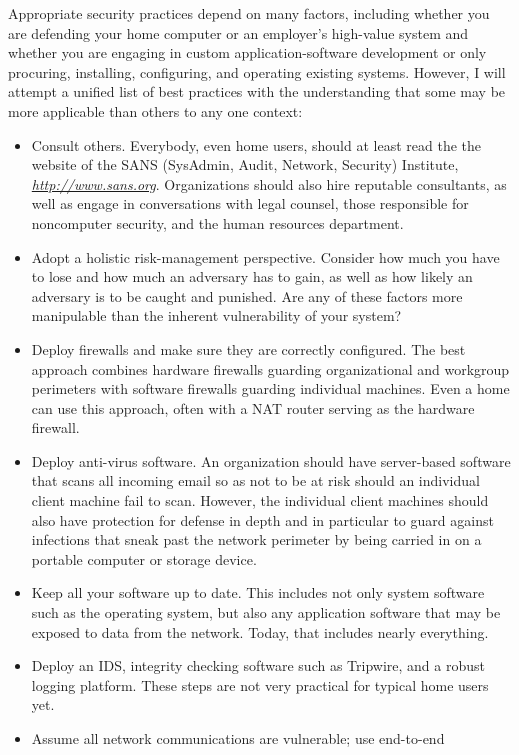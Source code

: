Appropriate security practices depend on many factors, including
whether you are defending your home computer or an employer's
high-value system and whether you are engaging in custom
application-software development or only procuring, installing,
configuring, and operating existing systems.  However, I will attempt
a unified list of best practices with the understanding that some may
be more applicable than others to any one context:
\begin{itemize}
\item
Consult others.  Everybody, even home users, should at least read the
the website of the SANS (SysAdmin, Audit, Network,
Security) Institute, \textit{\url{http://www.sans.org}}.  Organizations should also hire reputable
consultants, as well as engage in conversations with legal counsel,
those responsible for noncomputer security, and the human resources
department.
\item
Adopt a holistic risk-management perspective.  Consider how much you
have to lose and how much an adversary has to gain, as well as how
likely an adversary is to be caught and punished.  Are any of these
factors more manipulable than the inherent vulnerability of your
system?
\item
Deploy firewalls and make sure they are correctly configured.  The
best approach combines hardware firewalls guarding organizational and
workgroup perimeters with software firewalls guarding individual
machines.  Even a home can use this approach, often with a NAT router
serving as the hardware firewall.
\item
Deploy anti-virus software.  An organization should have server-based
software that scans all incoming email so as not to be at risk should
an individual client machine fail to scan.  However, the individual
client machines should also have protection for defense in depth and
in particular to guard against infections that sneak past the network
perimeter by being carried in on a portable computer or storage
device.
\item
Keep all your software up to date.  This includes not
only system software such as the operating system, but also any
application software that may be exposed to data from the network.
Today, that includes nearly everything.
\item
Deploy an IDS, integrity checking software such as Tripwire, and a
robust logging platform.  These steps are not very practical for
typical home users yet.
\item
Assume all network communications are vulnerable; use end-to-end

\end{itemize}
